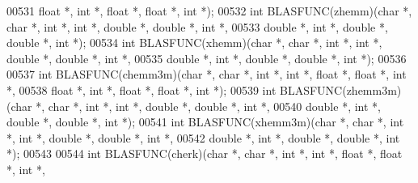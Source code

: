 \begin{DoxyCode}
00531        \textcolor{keywordtype}{float}  *, \textcolor{keywordtype}{int} *, \textcolor{keywordtype}{float}  *, \textcolor{keywordtype}{float}  *, \textcolor{keywordtype}{int} *);
00532 \textcolor{keywordtype}{int} BLASFUNC(zhemm)(\textcolor{keywordtype}{char} *, \textcolor{keywordtype}{char} *, \textcolor{keywordtype}{int} *, \textcolor{keywordtype}{int} *, \textcolor{keywordtype}{double} *, \textcolor{keywordtype}{double} *, \textcolor{keywordtype}{int} *,
00533        \textcolor{keywordtype}{double} *, \textcolor{keywordtype}{int} *, \textcolor{keywordtype}{double} *, \textcolor{keywordtype}{double} *, \textcolor{keywordtype}{int} *);
00534 \textcolor{keywordtype}{int} BLASFUNC(xhemm)(\textcolor{keywordtype}{char} *, \textcolor{keywordtype}{char} *, \textcolor{keywordtype}{int} *, \textcolor{keywordtype}{int} *, \textcolor{keywordtype}{double} *, \textcolor{keywordtype}{double} *, \textcolor{keywordtype}{int} *,
00535        \textcolor{keywordtype}{double} *, \textcolor{keywordtype}{int} *, \textcolor{keywordtype}{double} *, \textcolor{keywordtype}{double} *, \textcolor{keywordtype}{int} *);
00536 
00537 \textcolor{keywordtype}{int} BLASFUNC(chemm3m)(\textcolor{keywordtype}{char} *, \textcolor{keywordtype}{char} *, \textcolor{keywordtype}{int} *, \textcolor{keywordtype}{int} *, \textcolor{keywordtype}{float}  *, \textcolor{keywordtype}{float}  *, \textcolor{keywordtype}{int} *,
00538        \textcolor{keywordtype}{float}  *, \textcolor{keywordtype}{int} *, \textcolor{keywordtype}{float}  *, \textcolor{keywordtype}{float}  *, \textcolor{keywordtype}{int} *);
00539 \textcolor{keywordtype}{int} BLASFUNC(zhemm3m)(\textcolor{keywordtype}{char} *, \textcolor{keywordtype}{char} *, \textcolor{keywordtype}{int} *, \textcolor{keywordtype}{int} *, \textcolor{keywordtype}{double} *, \textcolor{keywordtype}{double} *, \textcolor{keywordtype}{int} *,
00540        \textcolor{keywordtype}{double} *, \textcolor{keywordtype}{int} *, \textcolor{keywordtype}{double} *, \textcolor{keywordtype}{double} *, \textcolor{keywordtype}{int} *);
00541 \textcolor{keywordtype}{int} BLASFUNC(xhemm3m)(\textcolor{keywordtype}{char} *, \textcolor{keywordtype}{char} *, \textcolor{keywordtype}{int} *, \textcolor{keywordtype}{int} *, \textcolor{keywordtype}{double} *, \textcolor{keywordtype}{double} *, \textcolor{keywordtype}{int} *,
00542        \textcolor{keywordtype}{double} *, \textcolor{keywordtype}{int} *, \textcolor{keywordtype}{double} *, \textcolor{keywordtype}{double} *, \textcolor{keywordtype}{int} *);
00543 
00544 \textcolor{keywordtype}{int} BLASFUNC(cherk)(\textcolor{keywordtype}{char} *, \textcolor{keywordtype}{char} *, \textcolor{keywordtype}{int} *, \textcolor{keywordtype}{int} *, \textcolor{keywordtype}{float}  *, \textcolor{keywordtype}{float}  *, \textcolor{keywordtype}{int} *,

\end{DoxyCode}
